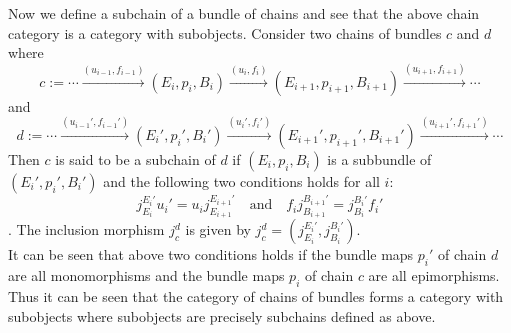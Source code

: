 \documentclass{amsart}
\theoremstyle{plain}
\begin{document}
Now we define a subchain of a bundle of chains and see that the above chain category is a category with subobjects.
Consider two chains of bundles $c$ and $d$ where\\
 $$c := \cdots \stackrel{(u_{i-1}, f_{i-1})}{\rightarrow} (E_i, p_i, B_i)  \stackrel{(u_{i}, f_{i})}{\rightarrow}(E_{i+1}, p_{i+1}, B_{i+1})  \stackrel{(u_{i+1}, f_{i+1})}{\rightarrow} \cdots $$ and $$d := \cdots \stackrel{(u_{i-1}', f_{i-1}')}{\rightarrow} (E_i', p_i', B_i')  \stackrel{(u_{i}', f_{i}')}{\rightarrow}(E_{i+1}', p_{i+1}', B_{i+1}')  \stackrel{(u_{i+1}', f_{i+1}')}{\rightarrow}\cdots  $$
 Then $c$ is said to be a subchain of $d$ if $(E_i, p_i, B_i)$ is a subbundle of $(E_i', p_i', B_i')$ and the following two conditions holds for all $i$:
 $$ j_{E_i}^{E_i'} u_i' = u_ij_{E_{i+1}}^{E_{i+1}'} \quad \text{and} \quad f_i j_{B_{i+1}}^{B_{i+1}'} =  j_{B_i}^{B_i'}f_i'  $$.
 The inclusion morphism $j_c^d$ is given by $j_c^d = ( j_{E_i}^{E_i'}, j_{B_i}^{B_i'} )$.\\
 It can be seen that above two conditions holds if the bundle maps $p_i'$ of chain $d$ are all monomorphisms and the bundle maps $p_i$ of chain $c$ are all epimorphisms.
 Thus it can be seen that the category of chains of bundles forms a category with subobjects where subobjects are precisely subchains defined as above.\\
 
\end{document}
